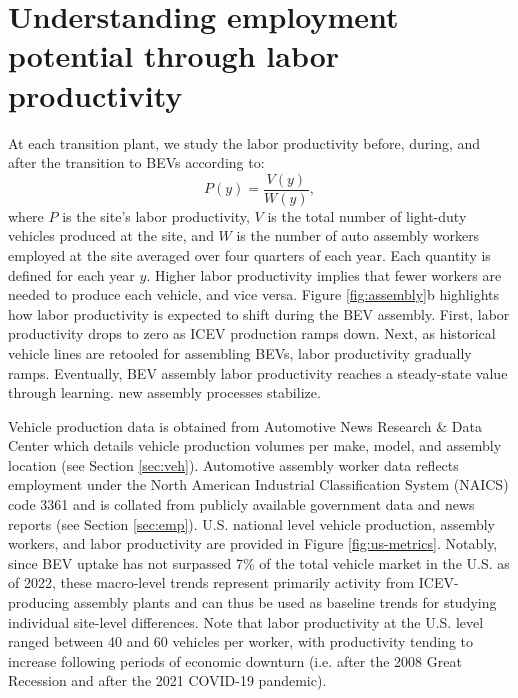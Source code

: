 \documentclass[sn-mathphys,Numbered]{sn-jnl}%
\begin{document}
\section{Understanding employment potential through labor productivity}

At each transition plant, we study the labor productivity before, during, and after the transition to BEVs according to: 
\begin{equation}
    P(y) = \frac{V(y)}{W(y)},
\end{equation}
where $P$ is the site's labor productivity, $V$ is the total number of light-duty vehicles produced at the site, and $W$ is the number of auto assembly workers employed at the site averaged over four quarters of each year. Each quantity is defined for each year $y$. Higher labor productivity implies that fewer workers are needed to produce each vehicle, and vice versa. Figure \ref{fig:assembly}b highlights how labor productivity is expected to shift during the BEV assembly. First, labor productivity drops to zero as ICEV production ramps down. Next, as historical vehicle lines are retooled for assembling BEVs, labor productivity gradually ramps. Eventually, BEV assembly labor productivity reaches a steady-state value through learning. new assembly processes stabilize. 

Vehicle production data is obtained from Automotive News Research \& Data Center \cite{Automotive_News2023-pg} which details vehicle production volumes per make, model, and assembly location (see Section \ref{sec:veh}). Automotive assembly worker data reflects employment under the North American Industrial Classification System (NAICS) code 3361 and is collated from publicly available government data and news reports (see Section \ref{sec:emp}). U.S. national level vehicle production, assembly workers, and labor productivity are provided in Figure \ref{fig:us-metrics}. Notably, since BEV uptake has not surpassed 7\% of the total vehicle market in the U.S. as of 2022, these macro-level trends represent primarily activity from ICEV-producing assembly plants and can thus be used as baseline trends for studying individual site-level differences. Note that labor productivity at the U.S. level ranged between 40 and 60 vehicles per worker, with productivity tending to increase following periods of economic downturn (i.e. after the 2008 Great Recession and after the 2021 COVID-19 pandemic). 

\end{document}
